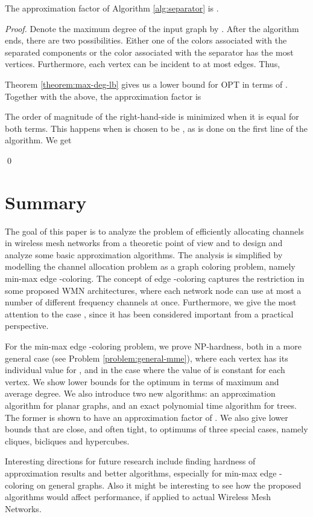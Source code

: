 \documentclass[runningheads, a4paper]{llncs}
\begin{document}
\begin{theorem}
The approximation factor of Algorithm \ref{alg:separator} is .
\end{theorem}
\begin{proof}
Denote the maximum degree of the input graph  by . After the algorithm ends, there are two possibilities. Either one of the colors associated with the separated components or the color associated with the separator has the most vertices. Furthermore, each vertex can be incident to at most  edges. Thus,

Theorem \ref{theorem:max-deg-lb} gives us a lower bound for OPT in terms of . Together with the above, the approximation factor is

The order of magnitude of the right-hand-side is minimized when it is equal for both terms. This happens when  is chosen to be , as is done on the first line of the algorithm. We get

\qed
\end{proof}

\section{Summary}\label{sect:summary}

The goal of this paper is to analyze the problem of efficiently allocating channels in wireless mesh networks from a theoretic point of view and to design and analyze some basic approximation algorithms. The analysis is simplified by modelling the channel allocation problem as a graph coloring problem, namely min-max edge -coloring. The concept of edge -coloring captures the restriction in some proposed WMN architectures, where each network node can use at most a number of different frequency channels at once. Furthermore, we give the most attention to the case , since it has been considered important from a practical perspective.

For the min-max edge -coloring problem, we prove NP-hardness, both in a more general case (see Problem \ref{problem:general-mme}), where each vertex has its individual value for , and in the case where the value of  is constant for each vertex.  We show lower bounds for the optimum in terms of maximum and average degree. We also introduce two new algorithms: an approximation algorithm for planar graphs, and an exact polynomial time algorithm for trees. The former is shown to have an approximation factor of . 
We also give lower bounds that are close, and often tight, to optimums of three special cases, namely cliques, bicliques and hypercubes.



Interesting directions for future research include finding hardness of approximation results and better algorithms, especially for min-max edge -coloring on general graphs. Also it might be interesting to see how the proposed algorithms would affect performance, if applied to actual Wireless Mesh Networks.



\end{document}
